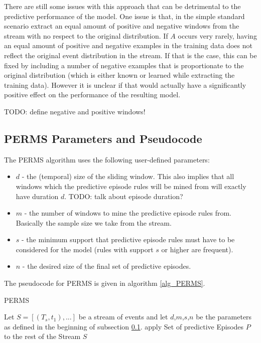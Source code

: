 There are still some issues with this approach that can be detrimental to the predictive performance of the model. One issue is that, in the simple standard scenario extract an equal amount of positive and negative windows from the stream with no respect to the original distribution. If $A$ occurs very rarely, having an equal amount of positive and negative examples in the training data does not reflect the original event distribution in the stream. If that is the case, this can be fixed by including a number of negative examples that is proportionate to the original distribution (which is either known or learned while extracting the training data). However it is unclear if that would actually have a significantly positive effect on the performance of the resulting model.



TODO: define negative and positive windows!




\subsection{PERMS Parameters and Pseudocode}
\label{subsec_perms}

The PERMS algorithm uses the following user-defined parameters:

\begin{itemize}
	\item \textbf{$d$} - the (temporal) size of the sliding window. This also implies that all windows which the predictive episode rules will be mined from will exactly have duration $d$. TODO: talk about episode duration?	
	\item \textbf{$m$} - the number of windows to mine the predictive episode rules from. Basically the sample size we take from the stream.
	\item \textbf{$s$} - the minimum support that predictive episode rules must have to be considered for the model (rules with support $s$ or higher are frequent).
	\item \textbf{$n$} - the desired size of the final set of predictive episodes.
\end{itemize}

The pseudocode for PERMS is given in algorithm \ref{alg_PERMS}. 


\begin{algorithm}[H]
  \caption{PERMS
    \label{alg_PERMS}}
  \begin{algorithmic}[1]
    \Statex
    \Require Let $S=[(T_s,t_1),...]$ be a stream of events and let $d$,$m$,$s$,$n$ be the parameters as defined in the beginning of subsection \ref{subsec_perms}.
      \State apply Set of predictive Episodes $P$ to the rest of the Stream $S$
    \EndFunction
  \end{algorithmic}
\end{algorithm}

